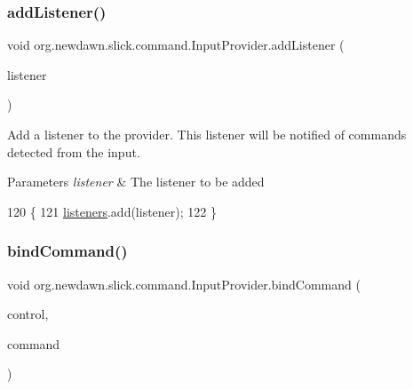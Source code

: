 \subsubsection{\texorpdfstring{add\+Listener()}{addListener()}}
{\footnotesize\ttfamily void org.\+newdawn.\+slick.\+command.\+Input\+Provider.\+add\+Listener (\begin{DoxyParamCaption}\item[{\mbox{\hyperlink{interfaceorg_1_1newdawn_1_1slick_1_1command_1_1_input_provider_listener}{Input\+Provider\+Listener}}}]{listener }\end{DoxyParamCaption})\hspace{0.3cm}{\ttfamily [inline]}}

Add a listener to the provider. This listener will be notified of commands detected from the input.


\begin{DoxyParams}{Parameters}
{\em listener} & The listener to be added \\
\hline
\end{DoxyParams}

\begin{DoxyCode}
120                                                             \{
121         \mbox{\hyperlink{classorg_1_1newdawn_1_1slick_1_1command_1_1_input_provider_a007146935ecc6c0f69ff3d7958042867}{listeners}}.add(listener);
122     \}
\end{DoxyCode}
\mbox{\label{classorg_1_1newdawn_1_1slick_1_1command_1_1_input_provider_a3d2308c3affc346525025891e91845fc}} 
\subsubsection{\texorpdfstring{bind\+Command()}{bindCommand()}}
{\footnotesize\ttfamily void org.\+newdawn.\+slick.\+command.\+Input\+Provider.\+bind\+Command (\begin{DoxyParamCaption}\item[{\mbox{\hyperlink{interfaceorg_1_1newdawn_1_1slick_1_1command_1_1_control}{Control}}}]{control,  }\item[{\mbox{\hyperlink{interfaceorg_1_1newdawn_1_1slick_1_1command_1_1_command}{Command}}}]{command }\end{DoxyParamCaption})\hspace{0.3cm}{\ttfamily [inline]}}

